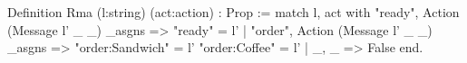 Definition Rma (l:string) (act:action) : Prop :=
  match l, act with
    "ready", Action (Message l' _ _) _asgns => "ready" = l'
  | "order", Action (Message l' _ _) _asgns => 
      "order:Sandwich" = l' \/ "order:Coffee" = l'
  | _, _ => False
  end.
